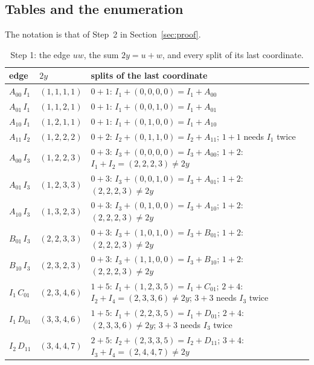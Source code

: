 \documentclass[11pt]{article}
\theoremstyle{definition}
\begin{document}
\begin{appendices}
\section{Tables and the enumeration}\label{app:enum}

The notation is that of Step~2 in Section~\ref{sec:proof}.

\begin{table}[ht]
\centering\footnotesize
\caption{Step 1: the edge $uw$, the sum $2y=u+w$, and every split of its last coordinate.}\label{tab:step1}
\begin{tabular}{lll}
\toprule
edge & $2y$ & splits of the last coordinate\\
\midrule
$A_{00}\,I_1$ & $(1,1,1,1)$ & $0+1$: $I_1 + (0,0,0,0) = I_1 + A_{00}$ \\
$A_{01}\,I_1$ & $(1,1,2,1)$ & $0+1$: $I_1 + (0,0,1,0) = I_1 + A_{01}$ \\
$A_{10}\,I_1$ & $(1,2,1,1)$ & $0+1$: $I_1 + (0,1,0,0) = I_1 + A_{10}$ \\
$A_{11}\,I_2$ & $(1,2,2,2)$ & $0+2$: $I_2 + (0,1,1,0) = I_2 + A_{11}$; $1+1$ needs $I_1$ twice \\
$A_{00}\,I_3$ & $(1,2,2,3)$ & $0+3$: $I_3 + (0,0,0,0) = I_3 + A_{00}$; $1+2$: $I_1 + I_2 = (2,2,2,3) \neq  2y$ \\
$A_{01}\,I_3$ & $(1,2,3,3)$ & $0+3$: $I_3 + (0,0,1,0) = I_3 + A_{01}$; $1+2$: $(2,2,2,3) \neq  2y$ \\
$A_{10}\,I_3$ & $(1,3,2,3)$ & $0+3$: $I_3 + (0,1,0,0) = I_3 + A_{10}$; $1+2$: $(2,2,2,3) \neq  2y$ \\
$B_{01}\,I_3$ & $(2,2,3,3)$ & $0+3$: $I_3 + (1,0,1,0) = I_3 + B_{01}$; $1+2$: $(2,2,2,3) \neq  2y$ \\
$B_{10}\,I_3$ & $(2,3,2,3)$ & $0+3$: $I_3 + (1,1,0,0) = I_3 + B_{10}$; $1+2$: $(2,2,2,3) \neq  2y$ \\
$I_1\,C_{01}$ & $(2,3,4,6)$ & $1+5$: $I_1 + (1,2,3,5) = I_1 + C_{01}$; $2+4$: $I_2 + I_4 = (2,3,3,6) \neq  2y$; $3+3$ needs $I_3$ twice \\
$I_1\,D_{01}$ & $(3,3,4,6)$ & $1+5$: $I_1 + (2,2,3,5) = I_1 + D_{01}$; $2+4$: $(2,3,3,6) \neq  2y$; $3+3$ needs $I_3$ twice \\
$I_2\,D_{11}$ & $(3,4,4,7)$ & $2+5$: $I_2 + (2,3,3,5) = I_2 + D_{11}$; $3+4$: $I_3 + I_4 = (2,4,4,7) \neq  2y$ \\
\bottomrule
\end{tabular}
\end{table}


\end{appendices}
\end{document}
